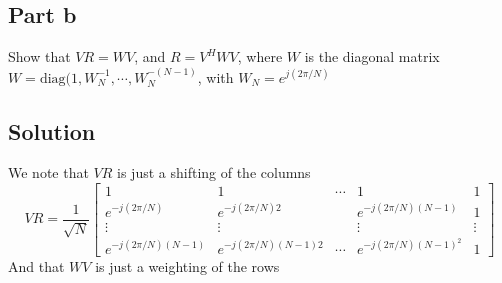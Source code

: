 \documentclass[a4paper]{article}
\begin{document}
\subsection*{Part b}%
Show that $VR = WV$,  and $R = V^HWV$, where $W$ is the diagonal matrix $W = \text{diag}(1, W_N^{-1}, \cdots, W_N^{-(N-1)}$, with $W_N = e^{j(2\pi/N)}$

\subsection*{Solution}%
We note that  $VR$ is just a shifting of the columns
\[
  VR = \frac{1}{\sqrt{N}}
  \begin{bmatrix}
    1 & 1 &  \cdots & 1 & 1 \\
    e^{-j(2\pi/N)}& e^{-j(2\pi/N)2} & & e^{-j(2\pi/N)(N-1)} & 1 \\
    \vdots & \vdots & &\vdots & \vdots \\
    e^{-j(2\pi/N)(N-1)} & e^{-j(2\pi/N)(N-1)2} & \cdots & e^{-j(2\pi/N)(N-1)^2} & 1
  \end{bmatrix}
\]
And that $WV$ is just a weighting of the rows
\end{document}

